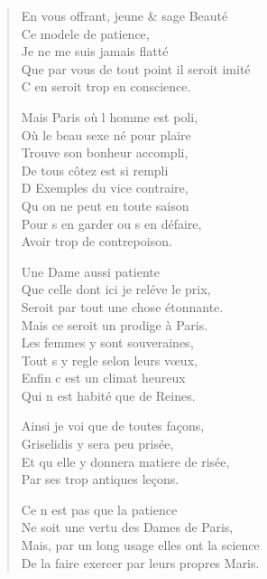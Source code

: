 \begin{verse}
En vous offrant, jeune \& sage Beauté \\
\vin Ce modele de patience, \\
\vin Je ne me suis jamais flatté \\
Que par vous de tout point il seroit imité \\
\vin C\textquotesingle{} en seroit trop en conscience.

\vin Mais Paris où l\textquotesingle{} homme est poli, \\
\vin Où le beau sexe né pour plaire \\
\vin Trouve son bonheur accompli, \\
\vin De tous côtez est si rempli \\
\vin D\textquotesingle{} Exemples du vice contraire, \\
\vin Qu\textquotesingle{} on ne peut en toute saison \\
\vin Pour s\textquotesingle{} en garder ou s\textquotesingle{} en défaire, \\
\vin Avoir trop de contrepoison.

\vin Une Dame aussi patiente \\
Que celle dont ici je reléve le prix, \\
\vin Seroit par tout une chose étonnante. \\
\vin Mais ce seroit un prodige à Paris. \\
\vin Les femmes y sont souveraines, \\
\vin Tout s\textquotesingle{} y regle selon leurs vœux, \\
\vin Enfin c\textquotesingle{} est un climat heureux \\
\vin Qui n\textquotesingle{} est habité que de Reines.

\vin Ainsi je voi que de toutes façons, \\
\vin Griselidis y sera peu prisée, \\
Et qu\textquotesingle{} elle y donnera matiere de risée, \\
\vin Par ses trop antiques leçons.

\vin Ce n\textquotesingle{} est pas que la patience \\
Ne soit une vertu des Dames de Paris, \\
Mais, par un long usage elles ont la science \\
De la faire exercer par leurs propres Maris.
\end{verse}

